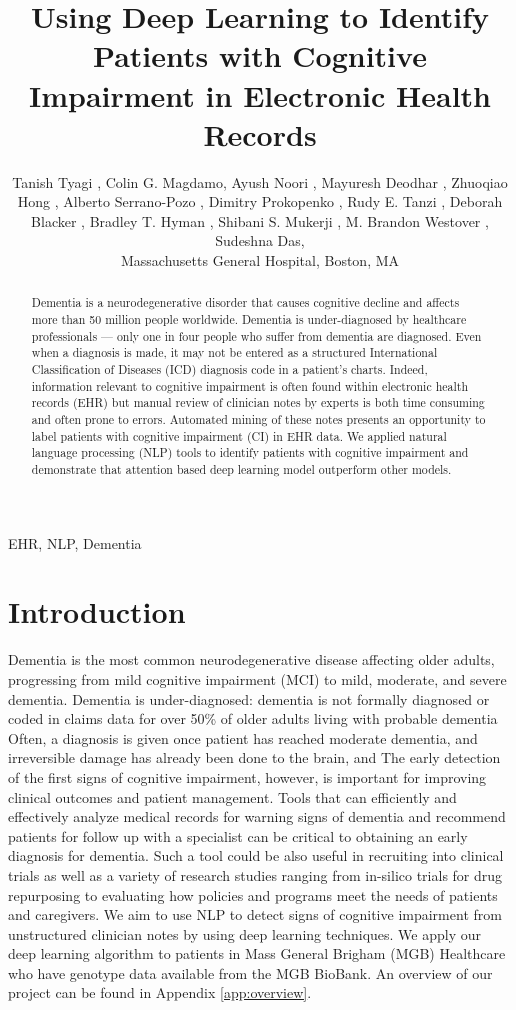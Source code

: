 \documentclass[pmlr,twocolumn,10pt]{jmlr} %
\title[NLP Techniques to Detect Cognitive Impairment]{Using Deep Learning to Identify Patients with Cognitive Impairment in Electronic Health Records}
\author{Tanish Tyagi \nametag{\thanks{Authors contributed equally}\SUP{1}},
Colin G. Magdamo\nametag{\footnotemark[1]\SUP{1}}, 
Ayush Noori \SUP{1},
Mayuresh Deodhar \SUP{1},
Zhuoqiao Hong \SUP{1},
Alberto Serrano-Pozo \SUP{1},
Dimitry Prokopenko \SUP{1},
Rudy E. Tanzi \SUP{2},
Deborah Blacker \SUP{1},
Bradley T. Hyman \SUP{1},
Shibani S. Mukerji \SUP{1},
M. Brandon Westover \SUP{1},
Sudeshna Das\SUP{1},
\centering \Email{
\\[\bigskipamount] 
\SUP{1}\{ttyagi, 
cmagdamo,
anoori1,
mdeodhar,
zhong1,
aserrano1,
dprokopenko,
dblacker,
bhyman,
smukerji,
mwestover,
sdas5\}
@mgh.harvard.edu}
\centering \Email{
\\[\bigskipamount] 
\SUP{2}\{tanzi\}@helix.mgh.harvard.edu
}
% 
\begin{center}\addr Massachusetts General Hospital, Boston, MA\end{center}
}
\begin{document}
\maketitle

\begin{abstract}
\hspace{10mm} Dementia is a neurodegenerative disorder that causes cognitive decline and affects more than 50 million people worldwide. Dementia is under-diagnosed by healthcare professionals — only one in four people who suffer from dementia are diagnosed. Even when a diagnosis is made, it may not be entered as a structured International Classification of Diseases (ICD) diagnosis code in a patient’s charts. Indeed, information relevant to cognitive impairment is often found within electronic health records (EHR) but manual review of clinician notes by experts is both time consuming and often prone to errors. Automated mining of these notes presents an opportunity to label patients with cognitive impairment (CI) in EHR data. We applied natural language processing (NLP) tools to identify patients with cognitive impairment and demonstrate that attention based deep learning model outperform other models. 
\end{abstract}

\begin{keywords}
EHR, NLP, Dementia
\end{keywords}

\section{Introduction}
\label{sec:intro} Dementia is the most common neurodegenerative disease affecting older adults, progressing from mild cognitive impairment (MCI) to mild, moderate, and severe dementia. Dementia is under-diagnosed: dementia is not formally diagnosed or coded in claims data for over 50\% of older adults living with probable dementia %
Often, a diagnosis is given once patient has reached moderate dementia, and irreversible damage has already been done to the brain, and 
The early detection of the first signs of cognitive impairment, however, is important for improving clinical outcomes and patient management. Tools that can efficiently and effectively analyze medical records for warning signs of dementia and recommend patients for follow up with a specialist can be critical to obtaining an early diagnosis for dementia. Such a tool could be also useful in recruiting into clinical trials as well as a variety of research studies ranging from in-silico trials for drug repurposing to evaluating how policies and programs meet the needs of patients and caregivers.  We aim to use NLP to detect signs of cognitive impairment from unstructured clinician notes by using deep learning techniques. We apply our deep learning algorithm to patients in Mass General Brigham (MGB) Healthcare who have genotype data available from the MGB BioBank. An overview of our project can be found in Appendix \ref{app:overview}. 
\end{document}
